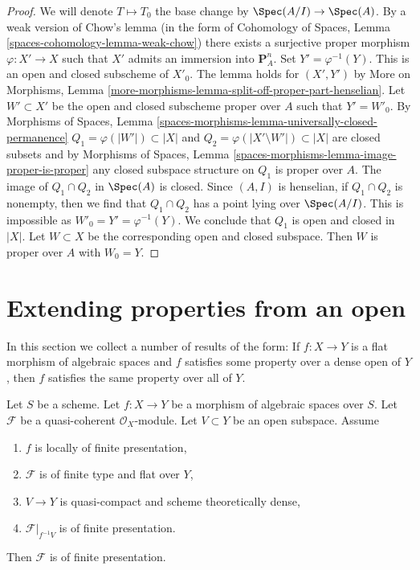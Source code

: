\begin{proof}
We will denote $T \mapsto T_0$ the base change by
$\Spec(A/I) \to \Spec(A)$.
By a weak version of Chow's lemma (in the form of
Cohomology of Spaces, Lemma \ref{spaces-cohomology-lemma-weak-chow})
there exists a surjective proper morphism $\varphi : X' \to X$ such
that $X'$ admits an immersion into $\mathbf{P}^n_A$.
Set $Y' = \varphi^{-1}(Y)$. This is an open and closed subscheme
of $X'_0$. The lemma holds for $(X', Y')$ by
More on Morphisms, Lemma
\ref{more-morphisms-lemma-split-off-proper-part-henselian}.
Let $W' \subset X'$ be the open and closed subscheme proper
over $A$ such that $Y' = W'_0$.
By Morphisms of Spaces, Lemma
\ref{spaces-morphisms-lemma-universally-closed-permanence}
$Q_1 = \varphi(|W'|) \subset |X|$ and
$Q_2 = \varphi(|X' \setminus W'|) \subset |X|$
are closed subsets and by
Morphisms of Spaces, Lemma \ref{spaces-morphisms-lemma-image-proper-is-proper}
any closed subspace structure on $Q_1$ is proper over $A$.
The image of $Q_1 \cap Q_2$ in $\Spec(A)$ is closed.
Since $(A, I)$ is henselian, if $Q_1 \cap Q_2$ is nonempty, then we
find that $Q_1 \cap Q_2$ has a point lying over $\Spec(A/I)$.
This is impossible as $W'_0 = Y' = \varphi^{-1}(Y)$.
We conclude that $Q_1$ is open and closed in $|X|$.
Let $W \subset X$ be the corresponding open and closed
subspace. Then $W$ is proper over $A$ with $W_0 = Y$.
\end{proof}










\section{Extending properties from an open}
\label{section-extending-properties}

\noindent
In this section we collect a number of results of the form: If $f : X \to Y$
is a flat morphism of algebraic spaces and $f$ satisfies some property over
a dense
open of $Y$, then $f$ satisfies the same property over all of $Y$.

\begin{lemma}
\label{lemma-flat-finite-type-finitely-presented-over-dense-open}
Let $S$ be a scheme.
Let $f : X \to Y$ be a morphism of algebraic spaces over $S$.
Let $\mathcal{F}$ be a quasi-coherent $\mathcal{O}_X$-module.
Let $V \subset Y$ be an open subspace. Assume
\begin{enumerate}
\item $f$ is locally of finite presentation,
\item $\mathcal{F}$ is of finite type and flat over $Y$,
\item $V \to Y$ is quasi-compact and scheme theoretically dense,
\item $\mathcal{F}|_{f^{-1}V}$ is of finite presentation.
\end{enumerate}
Then $\mathcal{F}$ is of finite presentation.
\end{lemma}

